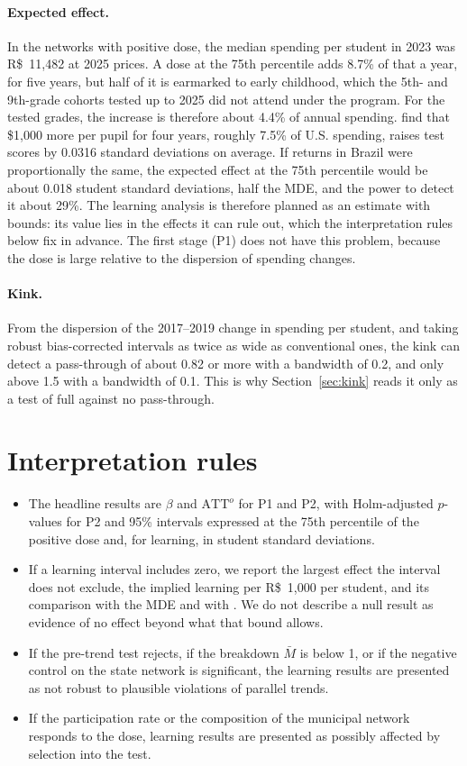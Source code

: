 \documentclass[11pt]{article}
\newcommand{\reais}{R\$}
\begin{document}
\paragraph{Expected effect.} In the networks with positive dose, the median spending per student in 2023 was \reais{}~11,482 at 2025 prices. A dose at the 75th percentile adds 8.7\% of that a year, for five years, but half of it is earmarked to early childhood, which the 5th- and 9th-grade cohorts tested up to 2025 did not attend under the program. For the tested grades, the increase is therefore about 4.4\% of annual spending. \citet{jackson2024} find that \$1,000 more per pupil for four years, roughly 7.5\% of U.S. spending, raises test scores by 0.0316 standard deviations on average. If returns in Brazil were proportionally the same, the expected effect at the 75th percentile would be about 0.018 student standard deviations, half the MDE, and the power to detect it about 29\%. The learning analysis is therefore planned as an estimate with bounds: its value lies in the effects it can rule out, which the interpretation rules below fix in advance. The first stage (P1) does not have this problem, because the dose is large relative to the dispersion of spending changes.

\paragraph{Kink.} From the dispersion of the 2017--2019 change in spending per student, and taking robust bias-corrected intervals as twice as wide as conventional ones, the kink can detect a pass-through of about 0.82 or more with a bandwidth of 0.2, and only above 1.5 with a bandwidth of 0.1. This is why Section~\ref{sec:kink} reads it only as a test of full against no pass-through.

\section{Interpretation rules}

\begin{itemize}
\item The headline results are $\beta$ and $\text{ATT}^o$ for P1 and P2, with Holm-adjusted $p$-values for P2 and 95\% intervals expressed at the 75th percentile of the positive dose and, for learning, in student standard deviations.
\item If a learning interval includes zero, we report the largest effect the interval does not exclude, the implied learning per \reais{}~1,000 per student, and its comparison with the MDE and with \citet{jackson2024}. We do not describe a null result as evidence of no effect beyond what that bound allows.
\item If the pre-trend test rejects, if the breakdown $\bar M$ is below 1, or if the negative control on the state network is significant, the learning results are presented as not robust to plausible violations of parallel trends.
\item If the participation rate or the composition of the municipal network responds to the dose, learning results are presented as possibly affected by selection into the test.
\end{itemize}
\end{document}
